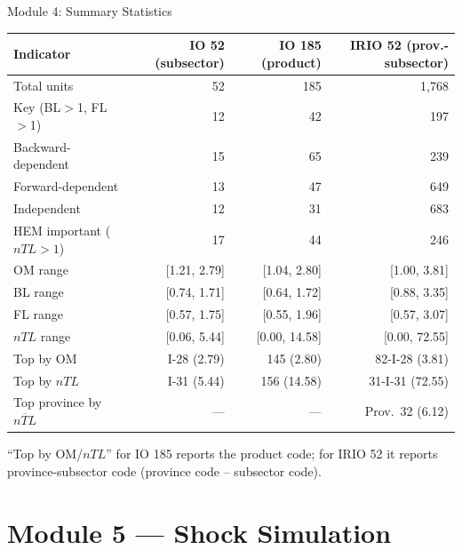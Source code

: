 \documentclass[aspectratio=169]{beamer}
\begin{document}
\begin{frame}{Module 4: Summary Statistics}
\begin{center}
\renewcommand{\arraystretch}{1.05}
\footnotesize
\begin{tabular}{@{}lrrr@{}}
\toprule
\textbf{Indicator} & \textbf{IO 52 (subsector)} & \textbf{IO 185 (product)} & \textbf{IRIO 52 (prov.-subsector)} \\
\midrule
Total units                    & 52           & 185          & 1{,}768 \\
Key (BL$>$1, FL$>$1)            & 12           & 42           & 197 \\
Backward-dependent              & 15           & 65           & 239 \\
Forward-dependent               & 13           & 47           & 649 \\
Independent                     & 12           & 31           & 683 \\
HEM important ($nTL > 1$)       & 17           & 44           & 246 \\
\midrule
OM range                        & [1.21, 2.79] & [1.04, 2.80] & [1.00, 3.81] \\
BL range                        & [0.74, 1.71] & [0.64, 1.72] & [0.88, 3.35] \\
FL range                        & [0.57, 1.75] & [0.55, 1.96] & [0.57, 3.07] \\
$nTL$ range                     & [0.06, 5.44] & [0.00, 14.58] & [0.00, 72.55] \\
\midrule
Top by OM                       & I-28 (2.79)  & 145 (2.80)   & 82-I-28 (3.81) \\
Top by $nTL$                    & I-31 (5.44)  & 156 (14.58)  & 31-I-31 (72.55) \\
\midrule
Top province by $\overline{nTL}$ & ---         & ---          & Prov.\ 32 (6.12) \\
\bottomrule
\end{tabular}
\end{center}

\medskip
\small
``Top by OM/$nTL$'' for IO 185 reports the product code; for IRIO 52 it reports province-subsector code (province code -- subsector code).
\end{frame}

\section{Module 5 --- Shock Simulation}
\end{document}
